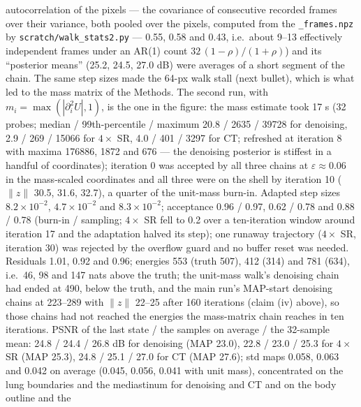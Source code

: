 \documentclass[11pt]{article}
\begin{document}
\begin{itemize}
        autocorrelation of the pixels --- the covariance of consecutive
        recorded frames over their variance, both pooled over the pixels,
        computed from the \texttt{\_frames.npz} by
        \texttt{scratch/walk\_stats2.py} --- 0.55, 0.58 and 0.43, i.e.\
        about 9--13 effectively independent frames under an AR(1) count
        $32\,(1-\rho)/(1+\rho)$) and its ``posterior means''
        (25.2, 24.5, 27.0 dB) were averages of a short segment of the
        chain. The same step sizes made the 64-px walk stall (next
        bullet), which is what led to the mass matrix of the Methods. The
        second run, with $m_i = \max(|\partial_i^2 U|, 1)$, is the one in
        the figure: the mass estimate took 17 s (32 probes; median /
        99th-percentile / maximum 20.8 / 2635 / 39728 for denoising, 2.9
        / 269 / 15066 for $4\times$ SR, 4.0 / 401 / 3297 for CT; refreshed
        at iteration 8 with maxima 176886, 1872 and 676 --- the denoising
        posterior is stiffest in a handful of coordinates); iteration 0
        was accepted by all three chains at $\varepsilon \approx 0.06$ in
        the mass-scaled coordinates and all three were on the shell by
        iteration 10 ($\|z\|$ 30.5, 31.6, 32.7), a quarter of the
        unit-mass burn-in. Adapted step sizes $8.2 \times 10^{-2}$, $4.7
        \times 10^{-2}$ and $8.3 \times 10^{-2}$; acceptance 0.96 / 0.97,
        0.62 / 0.78 and 0.88 / 0.78 (burn-in / sampling; $4\times$ SR fell
        to 0.2 over a ten-iteration window around iteration 17 and the
        adaptation halved its step); one runaway trajectory ($4\times$ SR,
        iteration 30) was rejected by the overflow guard and no buffer
        reset was needed. Residuals 1.01, 0.92 and 0.96; energies 553
        (truth 507), 412 (314) and 781 (634), i.e.\ 46, 98 and 147 nats
        above the truth; the unit-mass walk's denoising chain had ended
        at 490, below the truth, and the main run's MAP-start denoising
        chains at 223--289 with $\|z\|$ 22--25 after 160 iterations
        (claim (iv) above), so those chains had not reached the energies
        the mass-matrix chain reaches in ten iterations. PSNR
        of the last state / the samples on average / the 32-sample mean:
        24.8 / 24.4 / 26.8 dB for denoising (MAP 23.0), 22.8 / 23.0 / 25.3
        for $4\times$ SR (MAP 25.3), 24.8 / 25.1 / 27.0 for CT (MAP 27.6);
        std maps 0.058, 0.063 and 0.042 on average (0.045, 0.056, 0.041
        with unit mass), concentrated on the lung boundaries and the
        mediastinum for denoising and CT and on the body outline and the

\end{itemize}
\end{document}
